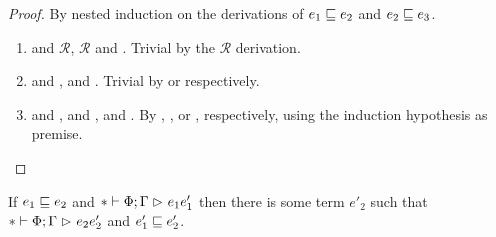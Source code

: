 \begin{proof}
By nested induction on the derivations of $e_1 \mathrel{\sqsubseteq} e_2$ and $e_2 \mathrel{\sqsubseteq} e_3$.
\begin{enumerate}[noitemsep, label=\textbf{Cases}, leftmargin=*, labelindent=\parindent]
  \item {} and $\mathcal{R}$, $\mathcal{R}$ and .
    Trivial by the $\mathcal{R}$ derivation.
  \item {} and ,  and .
    Trivial by  or  respectively.
  \item {} and ,  and ,  and .
    By , , or , respectively,
    using the induction hypothesis as premise. \qedhere
\end{enumerate}
\end{proof}

\begin{lemma} \label{lem:confluence-acum}
If $e_1 \mathrel{\sqsubseteq} e_2$ and $* \mathrel{\vdash} \Phi; \Gamma \mathrel{\rhd}_{} e_1{e'_1}$ then there is some term $e'_2$ such that
$* \mathrel{\vdash} \Phi; \Gamma \mathrel{\rhd}_{} e_2{e'_2}$ and $e'_1 \mathrel{\sqsubseteq} e'_2$.
\end{lemma}


